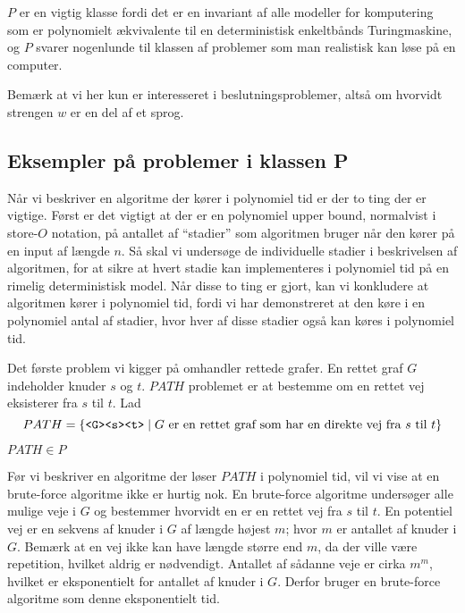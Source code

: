 $P$ er en vigtig klasse fordi det er en invariant af alle modeller for komputering som er polynomielt ækvivalente til en deterministisk enkeltbånds Turingmaskine, og $P$ svarer nogenlunde til klassen af problemer som man realistisk kan løse på en computer.

Bemærk at vi her kun er interesseret i beslutningsproblemer, altså om hvorvidt strengen $w$ er en del af et sprog.

\subsection{Eksempler på problemer i klassen P}%
\label{subsec:examplesinp}

Når vi beskriver en algoritme der kører i polynomiel tid er der to ting der er vigtige. Først er det vigtigt at der er en polynomiel upper bound, normalvist i store-$O$ notation, på antallet af ``stadier'' som algoritmen bruger når den kører på en input af længde $n$. Så skal vi undersøge de individuelle stadier i beskrivelsen af algoritmen, for at sikre at hvert stadie kan implementeres i polynomiel tid på en rimelig deterministisk model. Når disse to ting er gjort, kan vi konkludere at algoritmen kører i polynomiel tid, fordi vi har demonstreret at den køre i en polynomiel antal af stadier, hvor hver af disse stadier også kan køres i polynomiel tid.

Det første problem vi kigger på omhandler rettede grafer. En rettet graf $G$ indeholder knuder $s$ og $t$. $PATH$ problemet er at bestemme om en rettet vej eksisterer fra $s$ til $t$. Lad
\begin{equation*}
	PATH = \{\text{\texttt{<G><s><t>}} \mid G \text{ er en rettet graf som har en direkte vej fra } s \text{ til } t\}
\end{equation*}

\begin{theorem}
	$PATH \in P$
\end{theorem}

Før vi beskriver en algoritme der løser $PATH$ i polynomiel tid, vil vi vise at en brute-force algoritme ikke er hurtig nok. En brute-force algoritme undersøger alle mulige veje i $G$ og bestemmer hvorvidt en er en rettet vej fra $s$ til $t$. En potentiel vej er en sekvens af knuder i $G$ af længde højest $m$; hvor $m$ er antallet af knuder i $G$. Bemærk at en vej ikke kan have længde større end $m$, da der ville være repetition, hvilket aldrig er nødvendigt. Antallet af sådanne veje er cirka $m^{m}$, hvilket er eksponentielt for antallet af knuder i $G$. Derfor bruger en brute-force algoritme som denne eksponentielt tid.

